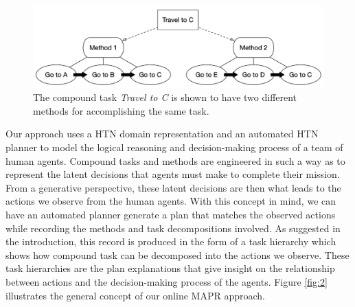\begin{figure}[h]
    \centering
    \includegraphics[width=1\textwidth]{images/htn_concepts}
    \caption{The compound task \textit{Travel to C} is shown to have two different methods for accomplishing the same task.} 
    \label{fig:1}
\end{figure}

Our approach uses a HTN domain representation and an automated HTN planner to model the logical reasoning and decision-making process of a team of human agents. Compound tasks and methods are engineered in such a way as to represent the latent decisions that agents must make to complete their mission. From a generative perspective, these latent decisions are then what leads to the actions we observe from the human agents. With this concept in mind, we can have an automated planner generate a plan that matches the observed actions while recording the methods and task decompositions involved. As suggested in the introduction, this record is produced in the form of a task hierarchy which shows how compound task can be decomposed into the actions we observe. These task hierarchies are the plan explanations that give insight on the relationship between actions and the decision-making process of the agents. Figure \ref{fig:2} illustrates the general concept of our online MAPR approach.


